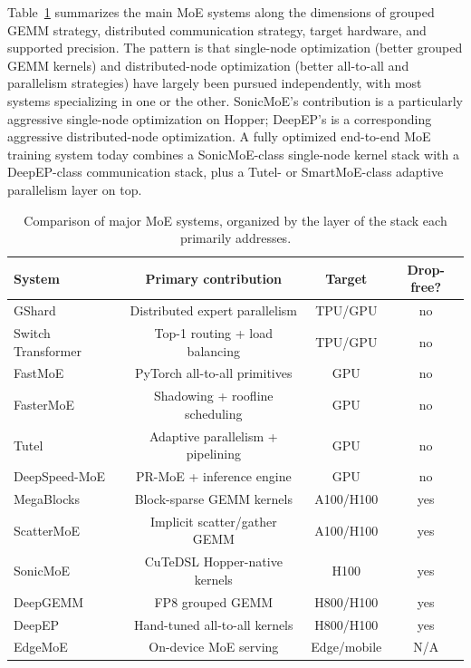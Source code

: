 \documentclass[10pt]{article}
\begin{document}
Table~\ref{tab:moe-systems} summarizes the main MoE systems along the dimensions of grouped GEMM strategy, distributed communication strategy, target hardware, and supported precision. The pattern is that single-node optimization (better grouped GEMM kernels) and distributed-node optimization (better all-to-all and parallelism strategies) have largely been pursued independently, with most systems specializing in one or the other. SonicMoE's contribution is a particularly aggressive single-node optimization on Hopper; DeepEP's is a corresponding aggressive distributed-node optimization. A fully optimized end-to-end MoE training system today combines a SonicMoE-class single-node kernel stack with a DeepEP-class communication stack, plus a Tutel- or SmartMoE-class adaptive parallelism layer on top.

\begin{table}[t]
\caption{Comparison of major MoE systems, organized by the layer of the stack each primarily addresses.}
\label{tab:moe-systems}
\centering\small
\begin{tabular}{lccc}
\toprule
System & Primary contribution & Target & Drop-free? \\
\midrule
GShard \citep{lepikhin2021gshard} & Distributed expert parallelism & TPU/GPU & no \\
Switch Transformer \citep{fedus2022switch} & Top-1 routing + load balancing & TPU/GPU & no \\
FastMoE \citep{he2021fastmoe} & PyTorch all-to-all primitives & GPU & no \\
FasterMoE \citep{he2022fastermoe} & Shadowing + roofline scheduling & GPU & no \\
Tutel \citep{hwang2023tutel} & Adaptive parallelism + pipelining & GPU & no \\
DeepSpeed-MoE \citep{rajbhandari2022deepspeedmoe} & PR-MoE + inference engine & GPU & no \\
MegaBlocks \citep{gale2023megablocks} & Block-sparse GEMM kernels & A100/H100 & yes \\
ScatterMoE \citep{tan2024scattermoe} & Implicit scatter/gather GEMM & A100/H100 & yes \\
SonicMoE \citep{sonicmoe2025} & CuTeDSL Hopper-native kernels & H100 & yes \\
DeepGEMM \citep{deepgemm2024} & FP8 grouped GEMM & H800/H100 & yes \\
DeepEP \citep{deepep2024} & Hand-tuned all-to-all kernels & H800/H100 & yes \\
EdgeMoE \citep{yi2023edgemoe} & On-device MoE serving & Edge/mobile & N/A \\
\bottomrule
\end{tabular}
\end{table}
\end{document}
